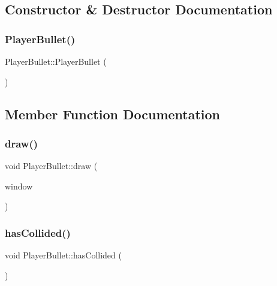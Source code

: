 \subsection{Constructor \& Destructor Documentation}
\mbox{\label{class_player_bullet_aff2ce7ed2770a6450664f489c9513375}} 
\subsubsection{\texorpdfstring{PlayerBullet()}{PlayerBullet()}}
{\footnotesize\ttfamily Player\+Bullet\+::\+Player\+Bullet (\begin{DoxyParamCaption}{ }\end{DoxyParamCaption})}



\subsection{Member Function Documentation}
\mbox{\label{class_player_bullet_ae599666f9f057599c6f7e45d1d025817}} 
\subsubsection{\texorpdfstring{draw()}{draw()}}
{\footnotesize\ttfamily void Player\+Bullet\+::draw (\begin{DoxyParamCaption}\item[{sf\+::\+Render\+Window \&}]{window }\end{DoxyParamCaption})}

\mbox{\label{class_player_bullet_ac36db806a8b41961134ad72d1e7136a5}} 
\subsubsection{\texorpdfstring{hasCollided()}{hasCollided()}}
{\footnotesize\ttfamily void Player\+Bullet\+::has\+Collided (\begin{DoxyParamCaption}{ }\end{DoxyParamCaption})}

